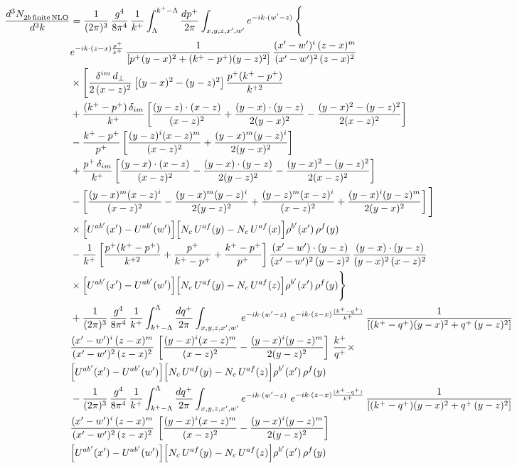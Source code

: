 \documentclass[9pt]{article}
\numberwithin{equation}{section}
\begin{document}
\begin{align}
    \frac{d^{3}N_{2b\,\rm finite\, NLO}^{\rm}}{d^{3}k} & = \frac{1}{(2\pi)^{3}}\,\frac{g^{4}}{8\pi^{4}}\,\frac{1}{k^{+}}\int_{\Lambda}^{k^{+}-\Lambda}\frac{dp^{+}}{2\pi}\int_{x,y,z,x',w'}e^{-ik\cdot(w'-z)}\,\Bigg\{\notag\\
&e^{-ik\cdot(z-x)\frac{p^{+}}{k^{+}}}\,\frac{1}{\left[p^{+}(y-x)^{2}+(k^{+}-p^{+})(y-z)^{2}\right]}\,\frac{(x'-w')^{i}\,(z-x)^{m}}{(x'-w')^{2}\,(z-x)^{2}}\notag\\
&\times\Bigg[\frac{\delta^{im}\,d_{\perp}}{2\,(x-z)^{2}}\left[(y-x)^{2}-(y-z)^{2}\right]\frac{p^{+}(k^{+}-p^{+})}{k^{+2}}
\notag \\ & +\frac{(k^{+}-p^{+})\,\delta_{im}}{k^{+}}\left[\frac{(y-z)\cdot(x-z)}{(x-z)^{2}}+\frac{(y-x)\cdot(y-z)}{2(y-x)^{2}}-\frac{(y-x)^{2}-(y-z)^{2}}{2(x-z)^{2}}\right]\notag\\
&-\frac{k^{+}-p^{+}}{p^{+}}\left[\frac{(y-z)^{i}(x-z)^{m}}{(x-z)^{2}}+\frac{(y-x)^{m}(y-z)^{i}}{2(y-x)^{2}}\right]\notag\\
&+\frac{p^{+}\,\delta_{im}}{k^{+}}\left[\frac{(y-x)\cdot(x-z)}{(x-z)^{2}}-\frac{(y-x)\cdot(y-z)}{2(y-z)^{2}}-\frac{(y-x)^{2}-(y-z)^{2}}{2(x-z)^{2}}\right]\notag\\
&-\left[\frac{(y-x)^{m}(x-z)^{i}}{(x-z)^{2}}-\frac{(y-x)^{m}(y-z)^{i}}{2(y-z)^{2}}+\frac{(y-z)^{m}(x-z)^{i}}{(x-z)^{2}}+\frac{(y-x)^{i}(y-z)^{m}}{2(y-x)^{2}}\right]\Bigg]\notag\\
&\times\Big[U^{ab'}(x')-U^{ab'}(w')\Big]\Big[N_{c}\,U^{af}(y)-N_{c}\,U^{af}(x)\Big]\rho^{b'}(x')\,\rho^{f}(y)\notag\\
&-\frac{1}{k^{+}}\left[\frac{p^{+}(k^{+}-p^{+})}{k^{+2}}+\frac{p^{+}}{k^{+}-p^{+}}+\frac{k^{+}-p^{+}}{p^{+}}\right]
\frac{(x'-w')\cdot(y-z)}{(x'-w')^{2}\,(y-z)^{2}}\,\frac{(y-x)\cdot(y-z)}{(y-x)^{2}\,(x-z)^{2}}\notag\\
&\times\Big[U^{ab'}(x')-U^{ab'}(w')\Big]\Big[N_{c}\,U^{af}(y)-N_{c}\,U^{af}(z)\Big]\rho^{b'}(x')\,\rho^{f}(y)\Bigg\}\notag \\ &  + \frac{1}{(2\pi)^{3}}\,\frac{g^{4}}{8\pi^{4}}\,\frac{1}{k^{+}}\int_{k^{+}-\Lambda}^{\Lambda}\frac{dq^{+}}{2\pi}\int_{x,y,z,x',w'}e^{-ik\cdot(w'-z)}\ e^{-ik\cdot(z-x)\frac{(k^{+}-q^{+})}{k^{+}}}\,\frac{1}{\left[(k^{+}-q^{+})(y-x)^{2}+q^{+}\,(y-z)^{2}\right]}\notag \\ & \frac{(x'-w')^{i}\,(z-x)^{m}}{(x'-w')^{2}\,(z-x)^{2}}\,\left[\frac{(y-x)^{i}(x-z)^{m}}{(x-z)^{2}}-\frac{(y-x)^{i}(y-z)^{m}}{2(y-z)^{2}}\right]\,\frac{k^{+}}{q^{+}}\times\notag \\ & \Big[U^{ab'}(x')-U^{ab'}(w')\Big]\Big[N_{c}\,U^{af}(y)-N_{c}\,U^{af}(z)\Big]\rho^{b'}(x')\,\rho^{f}(y)\notag \\ & - \frac{1}{(2\pi)^{3}}\,\frac{g^{4}}{8\pi^{4}}\,\frac{1}{k^{+}}\int_{k^{+}-\Lambda}^{\Lambda}\frac{dq^{+}}{2\pi}\int_{x,y,z,x',w'}e^{-ik\cdot(w'-z)}\ e^{-ik\cdot(z-x)\frac{(k^{+}-q^{+})}{k^{+}}}\,\frac{1}{\left[(k^{+}-q^{+})(y-x)^{2}+q^{+}\,(y-z)^{2}\right]}\notag \\ & \frac{(x'-w')^{i}\,(z-x)^{m}}{(x'-w')^{2}\,(z-x)^{2}}\,\left[\frac{(y-x)^{i}(x-z)^{m}}{(x-z)^{2}}-\frac{(y-x)^{i}(y-z)^{m}}{2(y-z)^{2}}\right]\notag \\ & \Big[U^{ab'}(x')-U^{ab'}(w')\Big]\Big[N_{c}\,U^{af}(y)-N_{c}\,U^{af}(z)\Big]\rho^{b'}(x')\,\rho^{f}(y)

\end{align}
\end{document}
